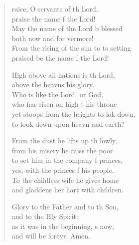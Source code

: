 \settowidth{\versewidth}{From the rising of the sun to its setting *}
\begin{verse}%
  \begin{patverse}
raise, O servants of th Lord,\Med\\
praise the name f the Lord!\\
May the name of the Lord b blessed\Med\\
both now and for vermore!\\
From the rising of the sun to \pointup{\i}ts setting\Med\\
praised be the name f the Lord!

High above all nations is th Lord,\Med\\
above the heavns his glory.\\
Who is like the Lord, ur God,\Med\\
who has risen on high t his throne\\
yet stoops from the heights to lok down,\Med\\
to look down upon heavn and earth?

From the dust he lifts up th lowly,\Med\\
from his misery he raiss the poor\\
to set him in the company f princes,\Med\\
yes, with the princes f his people.\\
To the childless wife he gives  home\Med\\
and gladdens her hart with children.

Glory to the Father and to th Son,\Med\\
and to the Hly Spirit:\\
as it was in the beginning, \pointup{\i}s now,\Med\\
and will be forevr. Amen.
  \end{patverse}
\end{verse}
